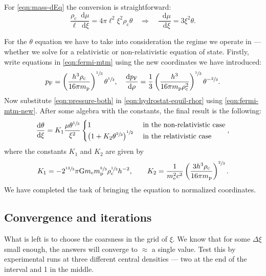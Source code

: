 \documentclass[]{article}
\newcommand{\dd}{\mathop{}\!\mathrm{d}}
\newcommand{\rhoCentre}{\rho_\mathrm{c}}
\newcommand{\massElectron}{m_\mathrm{e}}
\newcommand{\massProton}{m_\mathrm{p}}
\newcommand{\gravconst}{\mathrm{G}}
\begin{document}
	For \eqref{eqn:mass-dEq}  the conversion is straightforward:
	\begin{equation}
		\frac{\rho_\mathrm{c} \dd \mu}{\ell \dd \xi} = 4 \pi \ell^2 \xi^2 \rho_\mathrm{c} \theta \quad \Rightarrow \quad \frac{\dd \mu}{\dd \xi} = 3 \xi^2 \theta.
	\end{equation}

	For the $\theta$ equation we have to take into consideration the regime we operate in --- whether we solve for a relativistic or non-relativistic equation of state. Firstly, write equations in \eqref{eqn:fermi-mtm} using the new coordinates we have introduced:
	\begin{equation}\label{eqn:fermi-mtm-new}
		p_\mathrm{F} = \left( \frac{h^3 \rho_\mathrm{c}}{16 \pi m_\mathrm{p}}\right)^{\sfrac{1}{3}} \theta^{\sfrac{1}{3}} , \quad \frac{\dd p_\mathrm{F}}{\dd \rho} = \frac{1}{3} \left( \frac{h^3}{16 \pi m_\mathrm{p} \rho_\mathrm{c}^2}\right)^{\sfrac{1}{3}} \theta^{-\sfrac{2}{3}}.
	\end{equation}
	Now substitute \eqref{eqn:pressure-both} in \eqref{eqn:hydrostat-equil-rhor} using \eqref{eqn:fermi-mtm-new}. After some algebra with the constants, the final result is the following:
	\begin{equation}
		\frac{\dd \theta}{\dd \xi} = K_1 \frac{\mu \theta^{\sfrac{1}{3}}}{\xi^2} \begin{cases}
			1 & \text{ in the non-relativistic case}\\
			\left(1 + K_2 \theta^{\sfrac{2}{3}}\right)^{\sfrac{1}{2}} & \text{ in the relativistic case}
		\end{cases},
	\end{equation}
	where the constants $K_1$ and $K_2$ are given by
	\begin{equation}
		K_1 = - 2^{\sfrac{13}{3}} \pi \gravconst \massElectron \massProton^{\sfrac{5}{3}} \rhoCentre^{\sfrac{1}{3}} h^{-2} , \quad \quad K_2 = \frac{1}{\massElectron^2 c^2} \left( \frac{3h^3 \rhoCentre}{16 \pi \massProton} \right)^{\sfrac{2}{3}}.
	\end{equation}
	We have completed the task of bringing the equation to normalized coordinates. 

\subsection{Convergence and iterations}
	What is left is to choose the coarsness in the grid of $\xi$. We know that for some $\Delta \xi$ small enough, the answers will converge to $\approx$ a single value. Test this by experimental runs at three different central densities --- two at the end of the interval and 1 in the middle.
\end{document}
